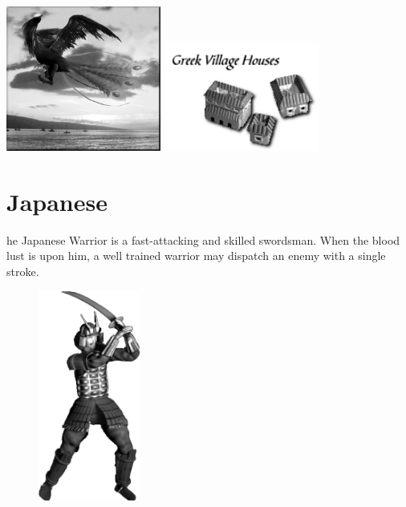 \begin{center}
	\includegraphics[width=2in]{Aphoenix} \hspace{1pt}\includegraphics[width=2in]{Igreekhouse}
\end{center}

\clearpage

\section{Japanese}


he Japanese Warrior is a fast-attacking and skilled swordsman. When the blood lust is upon him, a well trained warrior may dispatch an enemy with a single stroke.

\begin{figure}
	\begin{center}
		\vspace{-20pt}
		\includegraphics[width=0.3\textwidth]{Ajapanese}
	\end{center}
	\vspace{-40pt}
\end{figure}

